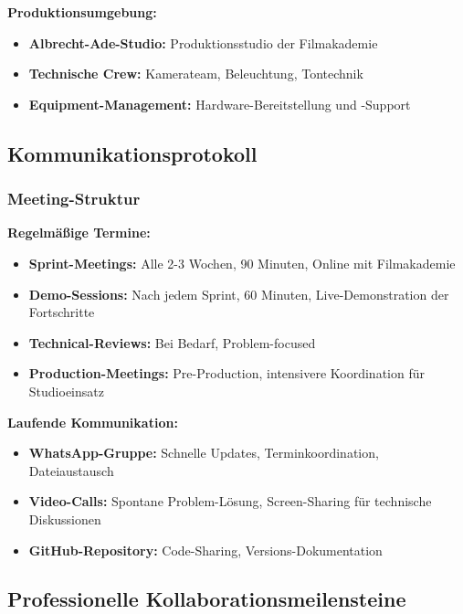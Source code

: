 \textbf{Produktionsumgebung:}
\begin{itemize}
    \item \textbf{Albrecht-Ade-Studio:} Produktionsstudio der Filmakademie
    \item \textbf{Technische Crew:} Kamerateam, Beleuchtung, Tontechnik
    \item \textbf{Equipment-Management:} Hardware-Bereitstellung und -Support
\end{itemize}

\subsection{Kommunikationsprotokoll}

\subsubsection{Meeting-Struktur}

\textbf{Regelmäßige Termine:}
\begin{itemize}
    \item \textbf{Sprint-Meetings:} Alle 2-3 Wochen, 90 Minuten, Online mit Filmakademie
    \item \textbf{Demo-Sessions:} Nach jedem Sprint, 60 Minuten, Live-Demonstration der Fortschritte
    \item \textbf{Technical-Reviews:} Bei Bedarf, Problem-focused
    \item \textbf{Production-Meetings:} Pre-Production, intensivere Koordination für Studioeinsatz
\end{itemize}

\textbf{Laufende Kommunikation:}
\begin{itemize}
    \item \textbf{WhatsApp-Gruppe:} Schnelle Updates, Terminkoordination, Dateiaustausch
    \item \textbf{Video-Calls:} Spontane Problem-Lösung, Screen-Sharing für technische Diskussionen
    \item \textbf{GitHub-Repository:} Code-Sharing, Versions-Dokumentation
\end{itemize}

\subsection{Professionelle Kollaborationsmeilensteine}


